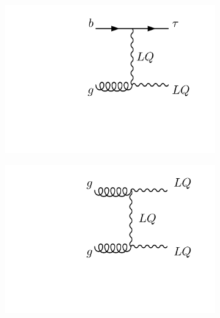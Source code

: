 \begin{figure}[!t]
    \centering
    \begin{subfigure}[b]{0.45\textwidth}
        \includegraphics[width = 1.1\textwidth]{Images/feynman_diagrams/sLQ.pdf}
        \caption{}
    \end{subfigure}
    \hfill
    \begin{subfigure}[b]{0.45\textwidth}
        \includegraphics[width =  1.1\textwidth]{Images/feynman_diagrams/dLQ.pdf}
        \caption{}
    \end{subfigure}
    \hfill
    \begin{subfigure}[b]{0.45\textwidth}

\end{subfigure}
\end{figure}
